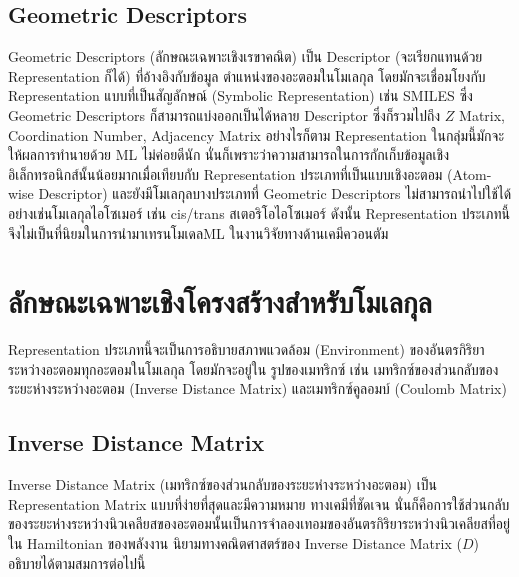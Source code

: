 \subsection{Geometric Descriptors}
\label{ssec:geom_descriptor}

Geometric Descriptors (ลักษณะเฉพาะเชิงเรขาคณิต) เป็น Descriptor (จะเรียกแทนด้วย Representation ก็ได้) ที่อ้างอิงกับข้อมูล%
ตำแหน่งของอะตอมในโมเลกุล โดยมักจะเชื่อมโยงกับ Representation แบบที่เป็นสัญลักษณ์ (Symbolic Representation) เช่น SMILES ซึ่ง 
Geometric Descriptors ก็สามารถแบ่งออกเป็นได้หลาย Descriptor ซึ่งก็รวมไปถึง $Z$ Matrix, Coordination Number, Adjacency 
Matrix อย่างไรก็ตาม Representation ในกลุ่มนี้มักจะให้ผลการทำนายด้วย ML ไม่ค่อยดีนัก นั่นก็เพราะว่าความสามารถในการกักเก็บข้อมูลเชิง%
อิเล็กทรอนิกส์นั้นน้อยมากเมื่อเทียบกับ Representation ประเภทที่เป็นแบบเชิงอะตอม (Atom-wise Descriptor) และยังมีโมเลกุลบางประเภทที่ 
Geometric Descriptors ไม่สามารถนำไปใช้ได้ อย่างเช่นโมเลกุลไอโซเมอร์ เช่น cis/trans สเตอริโอไอโซเมอร์ ดังนั้น Representation 
ประเภทนี้จึงไม่เป็นที่นิยมในการนำมาเทรนโมเดลML ในงานวิจัยทางด้านเคมีควอนตัม\autocite{keith2021,musil2021}

\section{ลักษณะเฉพาะเชิงโครงสร้างสำหรับโมเลกุล}
\label{sec:struc_feat_mol}

Representation ประเภทนี้จะเป็นการอธิบายสภาพแวดล้อม (Environment) ของอันตรกิริยาระหว่างอะตอมทุกอะตอมในโมเลกุล โดยมักจะอยู่ใน%
รูปของเมทริกซ์ เช่น เมทริกซ์ของส่วนกลับของระยะห่างระหว่างอะตอม (Inverse Distance Matrix) และเมทริกซ์คูลอมบ์ (Coulomb Matrix)

\subsection{Inverse Distance Matrix}
\label{ssec:inv_dist_mat}

Inverse Distance Matrix (เมทริกซ์ของส่วนกลับของระยะห่างระหว่างอะตอม) เป็น Representation Matrix แบบที่ง่ายที่สุดและมีความหมาย%
ทางเคมีที่ชัดเจน นั่นก็คือการใช้ส่วนกลับของระยะห่างระหว่างนิวเคลียสของอะตอมนั้นเป็นการจำลองเทอมของอันตรกิริยาระหว่างนิวเคลียสที่อยู่ใน 
Hamiltonian ของพลังงาน นิยามทางคณิตศาสตร์ของ Inverse Distance Matrix ($D$) อธิบายได้ตามสมการต่อไปนี้

